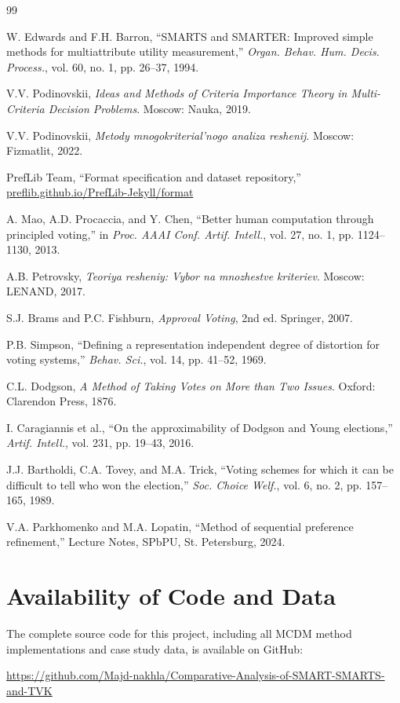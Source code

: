 \documentclass[conference]{IEEEtran}
\begin{document}
\begin{thebibliography}{99}
	
	W. Edwards and F.H. Barron, ``SMARTS and SMARTER: Improved simple methods for multiattribute utility measurement,'' \emph{Organ. Behav. Hum. Decis. Process.}, vol. 60, no. 1, pp. 26--37, 1994.
	
	V.V. Podinovskii, \emph{Ideas and Methods of Criteria Importance Theory in Multi-Criteria Decision Problems}. Moscow: Nauka, 2019.
	
	V.V. Podinovskii, \emph{Metody mnogokriterial'nogo analiza reshenij}. Moscow: Fizmatlit, 2022.
	
	PrefLib Team, ``Format specification and dataset repository,'' \href{https://preflib.github.io/PrefLib-Jekyll/format}{preflib.github.io/PrefLib-Jekyll/format}
	
	A. Mao, A.D. Procaccia, and Y. Chen, ``Better human computation through principled voting,'' in \emph{Proc. AAAI Conf. Artif. Intell.}, vol. 27, no. 1, pp. 1124--1130, 2013.
	
	A.B. Petrovsky, \emph{Teoriya resheniy: Vybor na mnozhestve kriteriev}. Moscow: LENAND, 2017.
	
	S.J. Brams and P.C. Fishburn, \emph{Approval Voting}, 2nd ed. Springer, 2007.
	
	P.B. Simpson, ``Defining a representation independent degree of distortion for voting systems,'' \emph{Behav. Sci.}, vol. 14, pp. 41--52, 1969.
	
	C.L. Dodgson, \emph{A Method of Taking Votes on More than Two Issues}. Oxford: Clarendon Press, 1876.
	
	I. Caragiannis et al., ``On the approximability of Dodgson and Young elections,'' \emph{Artif. Intell.}, vol. 231, pp. 19--43, 2016.
	
	J.J. Bartholdi, C.A. Tovey, and M.A. Trick, ``Voting schemes for which it can be difficult to tell who won the election,'' \emph{Soc. Choice Welf.}, vol. 6, no. 2, pp. 157--165, 1989.
	
	V.A. Parkhomenko and M.A. Lopatin, ``Method of sequential preference refinement,'' Lecture Notes, SPbPU, St. Petersburg, 2024.
	
\end{thebibliography}
\section*{Availability of Code and Data}
The complete source code for this project, including all MCDM method implementations and case study data, is available on GitHub:
\begin{center}
	\url{https://github.com/Majd-nakhla/Comparative-Analysis-of-SMART-SMARTS-and-TVK}
\end{center}
\end{document}
